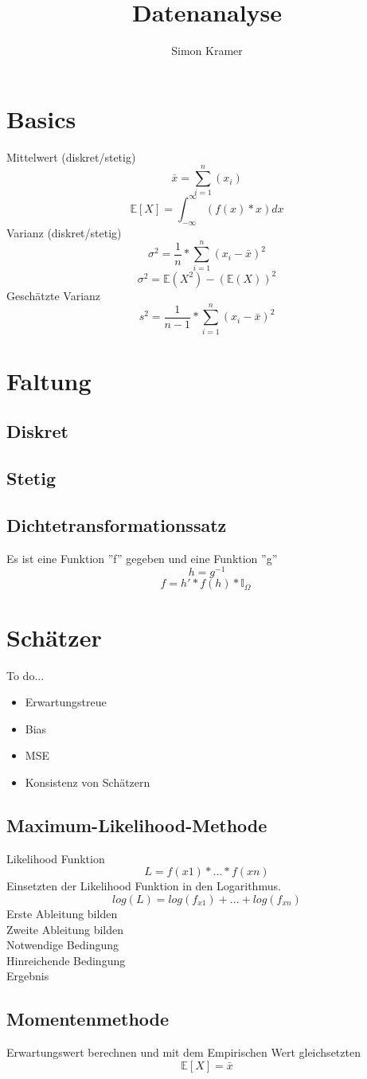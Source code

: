 \documentclass{article}
\title{Datenanalyse}
\author{Simon Kramer}
\begin{document}
	\maketitle
	\section{Basics}
	Mittelwert (diskret/stetig)
	\[\bar{x} = \sum_{i=1}^{n}(x_i) \]	
	\[\mathbb{E}[X]=\int_{-\infty}^{\infty} (f(x)*x) dx\]
	Varianz (diskret/stetig)
	\[{\sigma}^{2} = \frac{1}{n}*\sum_{i=1}^{n}(x_i - \bar{x})^2\]
	\[{\sigma}^{2} = \mathbb{E}(X^2)-(\mathbb{E}(X))^2\]
	Geschätzte Varianz
	\[{s}^{2} = \frac{1}{n-1}*\sum_{i=1}^{n}(x_i - \bar{x})^2\]
	\section{Faltung}
	\subsection{Diskret}
	\subsection{Stetig}
	\subsection{Dichtetransformationssatz}
	Es ist eine Funktion ''f'' gegeben und eine Funktion ''g''
	\[h = {g}^{-1}\]
	\[f = h' * f(h) * \mathbb{I}_\Omega \ \]
	\section{Schätzer}
	To do...
	\begin{itemize}
		\item Erwartungstreue
		\item Bias
		\item MSE
		\item Konsistenz von Schätzern
	\end{itemize}
	\subsection{Maximum-Likelihood-Methode}
	Likelihood Funktion
	\[L = f(x1) * ... * f(xn)\]
	Einsetzten der Likelihood Funktion in den Logarithmus.
	\[ log(L) = log(f_{x1})+...+log(f_{xn}) \]
	Erste Ableitung bilden
	\[\]
	Zweite Ableitung bilden
	\[\]
	Notwendige Bedingung
	\[\]
	Hinreichende Bedingung
	\[\]
	Ergebnis
	\[\]
	\subsection{Momentenmethode}
	Erwartungswert berechnen und mit dem Empirischen Wert gleichsetzten
	\[\mathbb{E}[X]=\bar{x}\]
	
\end{document}
